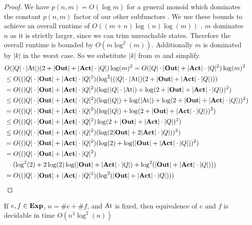 \documentclass[a4paper,UKenglish,cleveref, autoref, thm-restate]{lipics-v2021}
\newcommand{\Out}{\textbf{\upshape{Out}}}
\newcommand{\Act}{\textbf{\upshape{Act}}}
\newcommand{\At}{\text{\upshape{At}}}
\newcommand{\Exp}{\textbf{\upshape{Exp}}}
\newcommand{\wgkat}{\textsf{\upshape{wGKAT}}\xspace}
\theoremstyle{plain}\newtheoremrep{thm}{Theorem}[section]
\begin{document}
\begin{toappendix}
\begin{proof}
			We have $p(n,m) = O(\log m)$ for a general monoid \cite[Proof of Corollary 5.5]{10.1007/978-3-030-30942-8_18}  which dominates the constant $p(n,m)$ factor of our other subfunctors \cite[Section 3.2]{10.1007/978-3-030-30942-8_18}. We  use these bounds to achieve an overall runtime of $O((m+n)\log(n)\log(m))$ \cite[Theorem 3.4]{10.1007/978-3-030-30942-8_18}. $m$ dominates $n$ as it is strictly larger, since we can trim unreachable states. Therefore the overall runtime is bounded by $O(m\log^2(m))$. Additionally $m$ is dominated by $|k|$ in the worst case. So we substitute $|k|$ from $m$ and simplify.
			\begin{align*}
				&O(|Q|\cdot|\At|)(2+|\Out|+|\Act|\cdot|Q|) \log(m)^2 = O(|Q|\cdot|\Out|+|\Act|\cdot|Q|^2) \log(m)^2\\
				&\leq O((|Q|\cdot|\Out|+|\Act|\cdot|Q|^2)(\log^2 ((|Q|\cdot|\At|)(2+|\Out|+|\Act|\cdot|Q|)))\\
				&= O((|Q|\cdot|\Out|+|\Act|\cdot|Q|^2)(\log(|Q|\cdot|\At|) + \log(2+|\Out|+|\Act|\cdot|Q|))^2)\\
				&\leq O((|Q|\cdot|\Out|+|\Act|\cdot|Q|^2)(\log(|Q|) + \log(|\At|)+\log(2+|\Out|+|\Act|\cdot|Q|))^2)\\
				&= O((|Q|\cdot|\Out|+|\Act|\cdot|Q|^2)(\log(|Q|)+\log(2+|\Out|+|\Act|\cdot|Q|))^2)\\
				&\leq O((|Q|\cdot|\Out|+|\Act|\cdot|Q|^2)\log(2+|\Out|+|\Act|\cdot|Q|)^2)\\
				&\leq O((|Q|\cdot|\Out|+|\Act|\cdot|Q|^2)(\log(2|\Out|+2|\Act|\cdot|Q|))^2)\\
				&= O((|Q|\cdot|\Out|+|\Act|\cdot|Q|^2)(\log(2)+\log(|\Out|+|\Act|\cdot|Q|))^2)\\
				&= O((|Q|\cdot|\Out|+|\Act|\cdot|Q|^2)\\&\;\;\cdot(\log^2(2)+2\log(2)\log(|\Out|+|\Act|\cdot|Q|)+\log^2(|\Out|+|\Act|\cdot|Q|)))\\
				&= O((|Q|\cdot|\Out|+|\Act|\cdot|Q|^2)(\log^2(|\Out|+|\Act|\cdot|Q|)))\rlap{\qedhere} 
			\end{align*}
		\end{proof}
		\end{toappendix}
		\begin{correp}[Decidability]
			If $e, f \in \Exp$, $n = \# e + \# f$, and $\At$ is fixed, then \wgkat equivalence of $e$ and $f$ is decidable in time $O(n^3\log^2(n))$ \label{runtime}
		\end{correp}
\end{document}
